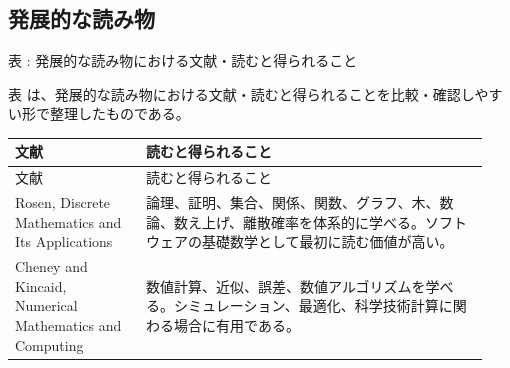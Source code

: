 \subsection{発展的な読み物}
\par\smallskip\noindent{}\label{tab:ch17-23}表 \thetable: 発展的な読み物における文献・読むと得られること\par\smallskip
表 \thetable は、発展的な読み物における文献・読むと得られることを比較・確認しやすい形で整理したものである。\par\smallskip
\begin{longtable}{>{\raggedright\arraybackslash}p{0.26\linewidth} >{\raggedright\arraybackslash}p{0.68\linewidth}}
\toprule
文献 & 読むと得られること \\
\midrule
\endfirsthead
\toprule
文献 & 読むと得られること \\
\midrule
\endhead
Rosen, Discrete Mathematics and Its Applications & 論理、証明、集合、関係、関数、グラフ、木、数論、数え上げ、離散確率を体系的に学べる。ソフトウェアの基礎数学として最初に読む価値が高い。 \\
Cheney and Kincaid, Numerical Mathematics and Computing & 数値計算、近似、誤差、数値アルゴリズムを学べる。シミュレーション、最適化、科学技術計算に関わる場合に有用である。 \\
\bottomrule
\end{longtable}
